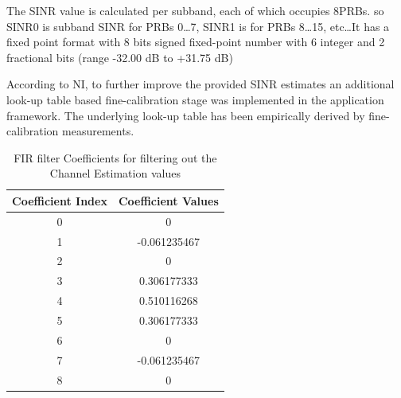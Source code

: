 The SINR value is calculated per subband, each of which occupies 8PRBs. so SINR0 is subband SINR for PRBs 0\ldots7, SINR1 is for PRBs 8\ldots15, etc\ldots It has a fixed point format with 8 bits signed fixed-point number with 6 integer and 2 fractional bits (range -32.00 \si{\dB} to +31.75 \si{\dB})

According to NI, to further improve the provided SINR estimates an additional look-up table based fine-calibration stage was implemented in the application framework. The underlying look-up table has been empirically derived by fine-calibration measurements.

\begin{table}[H]
    \begin{center}
        \begin{tabular}{|c|c|}
            \hline
            \textbf{Coefficient Index} & \textbf{Coefficient Values} \\ \hline
            0                          & 0                           \\ \hline
            1                          & -0.061235467                \\ \hline
            2                          & 0                           \\ \hline
            3                          & 0.306177333                 \\ \hline
            4                          & 0.510116268                 \\ \hline
            5                          & 0.306177333                 \\ \hline
            6                          & 0                           \\ \hline
            7                          & -0.061235467                \\ \hline
            8                          & 0                           \\ \hline
        \end{tabular}
    \end{center}
    \caption{FIR filter Coefficients for filtering out the Channel Estimation values}
    \label{tab:LPFCoeff}
\end{table}

